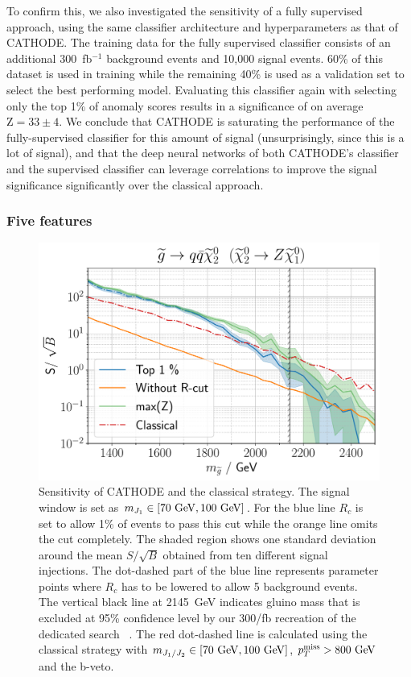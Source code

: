 \documentclass[prd, twocolumn, superscriptaddress,floatfix, nofootinbib, preprintnumbers]{revtex4-2}
\begin{document}
To confirm this, we also investigated the sensitivity of a fully supervised approach, using the same classifier architecture and hyperparameters as that of CATHODE. The training data for the fully supervised classifier consists of an additional 300~fb$^{-1}$ background events and 10,000 signal events. 60\% of this dataset is used in training while the remaining 40\% is used as a validation set to select the best performing model. Evaluating this classifier again with selecting only the top 1\% of anomaly scores results in a significance of on average $\text{Z}=33\pm 4$.  We conclude that CATHODE is saturating the performance of the fully-supervised classifier for this amount of signal (unsurprisingly, since this is a lot of signal), and that
the deep neural networks of both CATHODE's classifier and the supervised classifier can  leverage correlations to improve the signal significance significantly over the classical approach. 




\subsubsection{Five features}

\begin{figure}[t!]
\centering
\includegraphics[width=0.9\linewidth]{ZZ.pdf}
\caption{Sensitivity of CATHODE and the classical strategy. The signal window is set as $m_{J_1} \in [70~{\rm GeV},100~{\rm GeV}]$. For the blue line $R_c$ is set to allow 1\% of events to pass this cut while the orange line omits the cut completely. The shaded region shows one standard deviation around the mean $S/\sqrt{B}$ obtained from ten different signal injections. The dot-dashed part of the blue line represents parameter points where $R_c$ has to be lowered to allow 5 background events. The vertical black line at 2145~GeV indicates gluino mass that is excluded at 95\% confidence level by our 300/fb recreation of the dedicated search~\cite{CMS:2020fia} . The red dot-dashed line is calculated using the classical  strategy with $m_{J_1 / J_2} \in [70~{\rm GeV},100~{\rm GeV}]$, $p_T^\text{miss} > 800~{\rm GeV}$ and the b-veto.}
\label{fig:ZZ}
\end{figure}
\end{document}
